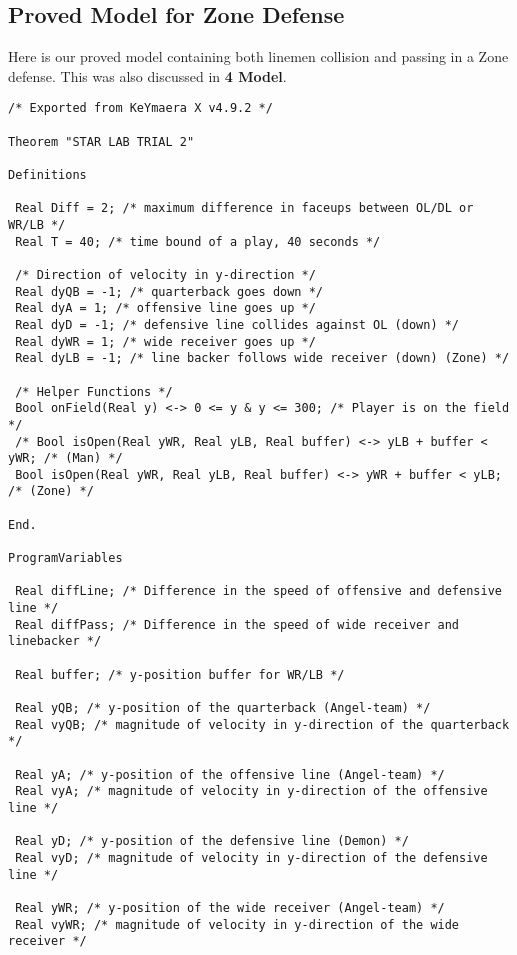 \newpage

\subsection{Proved Model for Zone Defense}
Here is our proved model containing both linemen collision and passing in a Zone defense. This was also discussed in \textbf{4 Model}.

\begin{lstlisting}
/* Exported from KeYmaera X v4.9.2 */

Theorem "STAR LAB TRIAL 2"

Definitions

 Real Diff = 2; /* maximum difference in faceups between OL/DL or WR/LB */
 Real T = 40; /* time bound of a play, 40 seconds */

 /* Direction of velocity in y-direction */
 Real dyQB = -1; /* quarterback goes down */
 Real dyA = 1; /* offensive line goes up */
 Real dyD = -1; /* defensive line collides against OL (down) */
 Real dyWR = 1; /* wide receiver goes up */
 Real dyLB = -1; /* line backer follows wide receiver (down) (Zone) */

 /* Helper Functions */
 Bool onField(Real y) <-> 0 <= y & y <= 300; /* Player is on the field */
 /* Bool isOpen(Real yWR, Real yLB, Real buffer) <-> yLB + buffer < yWR; /* (Man) */
 Bool isOpen(Real yWR, Real yLB, Real buffer) <-> yWR + buffer < yLB; /* (Zone) */

End.

ProgramVariables

 Real diffLine; /* Difference in the speed of offensive and defensive line */
 Real diffPass; /* Difference in the speed of wide receiver and linebacker */

 Real buffer; /* y-position buffer for WR/LB */

 Real yQB; /* y-position of the quarterback (Angel-team) */
 Real vyQB; /* magnitude of velocity in y-direction of the quarterback */

 Real yA; /* y-position of the offensive line (Angel-team) */
 Real vyA; /* magnitude of velocity in y-direction of the offensive line */

 Real yD; /* y-position of the defensive line (Demon) */
 Real vyD; /* magnitude of velocity in y-direction of the defensive line */

 Real yWR; /* y-position of the wide receiver (Angel-team) */
 Real vyWR; /* magnitude of velocity in y-direction of the wide receiver */


\end{lstlisting}
